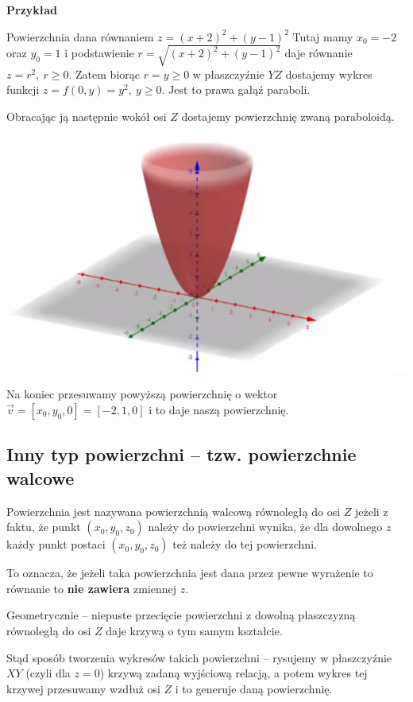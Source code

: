 \textbf{Przykład}

Powierzchnia dana równaniem $ z = (x+2)^2 + (y-1)^2 $
Tutaj mamy $ x_0 = -2 $ oraz $ y_0 = 1 $ i podstawienie $ r = \sqrt{(x+2)^2 + (y-1)^2} $ daje równanie $ z = r^2, \ r \geq 0 $.
Zatem biorąc $ r = y \geq 0 $ w płaszczyźnie $YZ$ dostajemy wykres funkcji $ z = f(0, y) = y^2, \ y \geq 0 $. Jest to prawa gałąź
paraboli.

Obracając ją następnie wokół osi $Z$ dostajemy powierzchnię zwaną paraboloidą.

\begin{center}
\includegraphics[scale=0.6]{img/paraboloida.png}
\end{center}

Na koniec przesuwamy powyższą powierzchnię o wektor $ \vec{v} = [x_0, y_0, 0] = [-2, 1, 0] $ i to daje naszą powierzchnię.

\subsection*{Inny typ powierzchni -- tzw. powierzchnie walcowe}

Powierzchnia jest nazywana powierzchnią walcową równoległą do osi $Z$ jeżeli z faktu, że punkt $ (x_0,y_0,z_0) $
należy do powierzchni wynika, że dla dowolnego $z$ każdy punkt postaci $(x_0, y_0, z_0)$ też należy do tej powierzchni.

To oznacza, że jeżeli taka powierzchnia jest dana przez pewne wyrażenie to równanie to \textbf{nie zawiera} zmiennej $z$.

Geometrycznie -- niepuste przecięcie powierzchni z dowolną płaszczyzną równoległą do osi $Z$ daje krzywą o tym samym kształcie.

Stąd sposób tworzenia wykresów takich powierzchni -- rysujemy w płaszczyźnie $XY$ (czyli dla $z=0$) krzywą zadaną wyjściową relacją,
a potem wykres tej krzywej przesuwamy wzdłuż osi $Z$ i to generuje daną powierzchnię. \\ 

